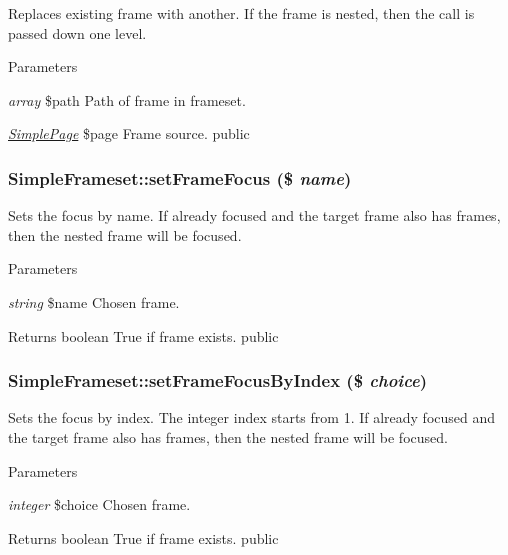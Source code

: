 \label{class_simple_frameset_a70729731514a1be863bef62e5689c029}
Replaces existing frame with another. If the frame is nested, then the call is passed down one level. 
\begin{DoxyParams}{Parameters}
\item[{\em array}]\$path Path of frame in frameset. \item[{\em \hyperlink{class_simple_page}{SimplePage}}]\$page Frame source.  public \end{DoxyParams}
\hypertarget{class_simple_frameset_aa42deea814c0ebac11b76f2bea262966}{
\subsubsection[{setFrameFocus}]{\setlength{\rightskip}{0pt plus 5cm}SimpleFrameset::setFrameFocus (\$ {\em name})}}
\label{class_simple_frameset_aa42deea814c0ebac11b76f2bea262966}
Sets the focus by name. If already focused and the target frame also has frames, then the nested frame will be focused. 
\begin{DoxyParams}{Parameters}
\item[{\em string}]\$name Chosen frame. \end{DoxyParams}
\begin{DoxyReturn}{Returns}
boolean True if frame exists.  public 
\end{DoxyReturn}
\hypertarget{class_simple_frameset_ac461be8fee34bfe59dcfbe12957a9f38}{
\subsubsection[{setFrameFocusByIndex}]{\setlength{\rightskip}{0pt plus 5cm}SimpleFrameset::setFrameFocusByIndex (\$ {\em choice})}}
\label{class_simple_frameset_ac461be8fee34bfe59dcfbe12957a9f38}
Sets the focus by index. The integer index starts from 1. If already focused and the target frame also has frames, then the nested frame will be focused. 
\begin{DoxyParams}{Parameters}
\item[{\em integer}]\$choice Chosen frame. \end{DoxyParams}
\begin{DoxyReturn}{Returns}
boolean True if frame exists.  public 
\end{DoxyReturn}
